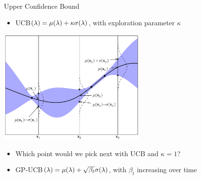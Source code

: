 \begin{frame}[c,fragile]{Upper Confidence Bound}
\begin{itemize}
\vspace*{-0.2cm}
  \item UCB$(\mathbf{\lambda}) = \mu(\mathbf{\lambda}) + \kappa\sigma(\mathbf{\lambda})$, with exploration parameter $\kappa$
\end{itemize}
\vspace*{-0.2cm}  
\centering
\includegraphics[width=0.55\textwidth]{images/Acquisition-UCB.png} 
\vspace*{0.2cm}  
\begin{itemize}
\item Which point would we pick next with UCB and $\kappa = 1$? \hands
\pause
 \item GP-UCB$(\mathbf{\lambda}) = \mu(\mathbf{\lambda}) + \sqrt{\beta_t} \sigma(\mathbf{\lambda})$, with $\beta_t$ \alert{increasing} over time\\
\end{itemize}

\end{frame}
